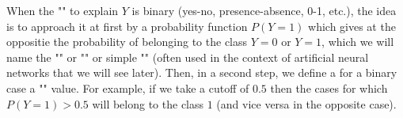 	When the "" to explain $Y$ is binary (yes-no, presence-absence, 0-1, etc.), the idea is to approach it at first by a probability function $P(Y=1)$ which gives at the oppositie the probability of belonging to the class $Y=0$ or $Y=1$, which we will name the "" or "" or simple "" (often used in the context of artificial neural networks that we will see later). Then, in a second step, we define a for a binary case a "" value. For example, if we take a cutoff of $0.5$ then the cases for which $P(Y=1)>0.5$ will belong to the class $1$ (and vice versa in the opposite case).
	
